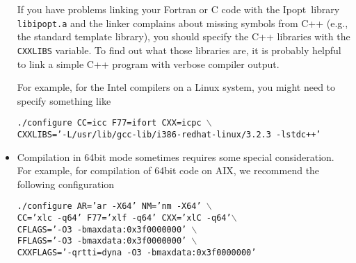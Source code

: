 \documentclass[10pt]{article}
\newcommand{\Ipopt}{{\sc Ipopt}}
\begin{document}
\begin{itemize}
  If you have problems linking your Fortran or C code with the \Ipopt\
  library {\tt libipopt.a} and the linker complains about missing
  symbols from C++ (e.g., the standard template library), you should
  specify the C++ libraries with the {\tt CXXLIBS} variable.  To find out
  what those libraries are, it is probably helpful to link a  simple C++
  program with verbose compiler output.

  For example, for the Intel compilers on a Linux system, you
  might need to specify something like

  {\tt ./configure CC=icc F77=ifort CXX=icpc $\backslash$\\ \hspace*{14ex} CXXLIBS='-L/usr/lib/gcc-lib/i386-redhat-linux/3.2.3 -lstdc++'}

\item Compilation in 64bit mode sometimes requires some special
  consideration.  For example, for compilation of 64bit code on AIX,
  we recommend the following configuration

  {\tt ./configure AR='ar -X64' NM='nm -X64' $\backslash$\\
    \hspace*{14ex} CC='xlc -q64' F77='xlf -q64' CXX='xlC
    -q64'$\backslash$\\ \hspace*{14ex} CFLAGS='-O3
    -bmaxdata:0x3f0000000'
    $\backslash$\\ \hspace*{14ex} FFLAGS='-O3 -bmaxdata:0x3f0000000' $\backslash$\\
    \hspace*{14ex} CXXFLAGS='-qrtti=dyna -O3 -bmaxdata:0x3f0000000'}




\end{itemize}
\end{document}
